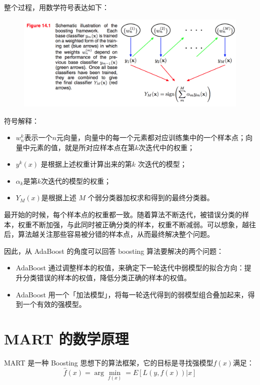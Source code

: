 \documentclass[12pt]{article}
\begin{document}
整个过程，用数学符号表达如下：
\begin{figure}[H]
\centering
\includegraphics[width=.8\textwidth]{fig/boosting_process.png} 
\end{figure}

符号解释：
\begin{itemize}
\setlength{\itemsep}{0pt}
\setlength{\parsep}{0pt}
\setlength{\parskip}{0pt}
    \item $w_n^{k}$表示一个$n$元向量，向量中的每一个元素都对应训练集中的一个样本点；向量中元素的值，就是所对应样本点在第$k$次迭代中的权重；
    \item $y^k(x)$ 是根据上述权重计算出来的第$k$ 次迭代的模型；
    \item  $\alpha_k$是第$k$次迭代的模型的权重；
    \item $Y_M(x)$是根据上述 $M$ 个弱分类器加权求和得到的最终分类器。
\end{itemize}

最开始的时候，每个样本点的权重都一致。随着算法不断迭代，被错误分类的样本，权重不断加强，与此同时被正确分类的样本，权重不断减弱。可以想象，越往后，算法越关注那些容易被分错的样本点，从而最终解决整个问题。

因此，从 AdaBoost 的角度可以回答 boosting 算法要解决的两个问题：
\begin{itemize}
\setlength{\itemsep}{0pt}
\setlength{\parsep}{0pt}
\setlength{\parskip}{0pt}
    \item AdaBoost 通过调整样本的权值，来确定下一轮迭代中弱模型的拟合方向：提升分类错误的样本的权值，降低分类正确的样本的权值。
    \item AdaBoost 用一个「加法模型」，将每一轮迭代得到的弱模型组合叠加起来，得到一个有效的强模型。
\end{itemize}

\section{MART 的数学原理}
MART 是一种 Boosting 思想下的算法框架，它的目标是寻找强模型$f(x)$满足：
$$
\hat{f}(x) = \arg\min_{f(x)} = E[L(y,f(x))|x]
$$
\end{document}
